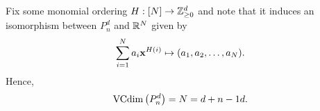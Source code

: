 \begin{ex}
\begin{enumerate}
\begin{enumerate}[1.]
\begin{enumerate}[1.]
                          Fix some monomial ordering $H: [N] \to \mathbb{Z}_{\geq 0}^d$ and
                          note that it induces an isomorphism between
                          $P^d_n$ and $\mathbb{R}^N$ given by
                          \[
                            \sum_{i=1}^N a_i\mathbf{x}^{H(i)} \mapsto (a_1,a_2,\ldots,a_N).
                          \]
                          Hence,
                          \[
                            \operatorname{VCdim}\left(P^d_n\right)=N={d+n-1}{d}.
                          \]
                  \end{enumerate}
          \end{enumerate}
  \end{enumerate}
\end{ex}